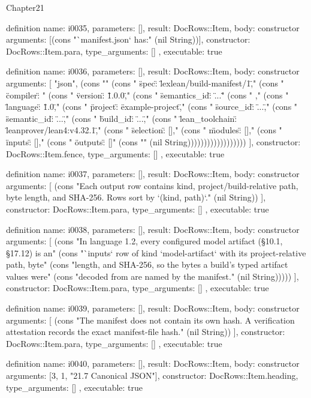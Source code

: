 \begin{lexlean}{Chapter21}
\begin{semanticmodule}
definition{
  name: i0035,
  parameters: [],
  result: DocRows::Item,
  body: constructor{
    arguments: [(cons "`manifest.json` has:" (nil String))],
    constructor: DocRows::Item.para,
    type_arguments: []
  },
  executable: true
}

definition{
  name: i0036,
  parameters: [],
  result: DocRows::Item,
  body: constructor{
    arguments: [
      "json",
      (cons "{" (cons "  \"spec\": \"lexlean/build-manifest/1\"," (cons "  \"compiler\": {" (cons "    \"version\": \"1.0.0\"," (cons "    \"semantics_id\": \"...\"" (cons "  }," (cons "  \"language\": \"1.0\"," (cons "  \"project\": \"example-project\"," (cons "  \"source_id\": \"...\"," (cons "  \"semantic_id\": \"...\"," (cons "  \"build_id\": \"...\"," (cons "  \"lean_toolchain\": \"leanprover/lean4:v4.32.1\"," (cons "  \"selection\": []," (cons "  \"modules\": []," (cons "  \"inputs\": []," (cons "  \"outputs\": []" (cons "}" (nil String))))))))))))))))))
    ],
    constructor: DocRows::Item.fence,
    type_arguments: []
  },
  executable: true
}

definition{
  name: i0037,
  parameters: [],
  result: DocRows::Item,
  body: constructor{
    arguments: [
      (cons "Each output row contains kind, project/build-relative path, byte length, and SHA-256. Rows sort by `(kind, path)`." (nil String))
    ],
    constructor: DocRows::Item.para,
    type_arguments: []
  },
  executable: true
}

definition{
  name: i0038,
  parameters: [],
  result: DocRows::Item,
  body: constructor{
    arguments: [
      (cons "In language 1.2, every configured model artifact (§10.1, §17.12) is an" (cons "`inputs` row of kind `model-artifact` with its project-relative path, byte" (cons "length, and SHA-256, so the bytes a build's typed artifact values were" (cons "decoded from are named by the manifest." (nil String)))))
    ],
    constructor: DocRows::Item.para,
    type_arguments: []
  },
  executable: true
}

definition{
  name: i0039,
  parameters: [],
  result: DocRows::Item,
  body: constructor{
    arguments: [
      (cons "The manifest does not contain its own hash. A verification attestation records the exact manifest-file hash." (nil String))
    ],
    constructor: DocRows::Item.para,
    type_arguments: []
  },
  executable: true
}

definition{
  name: i0040,
  parameters: [],
  result: DocRows::Item,
  body: constructor{
    arguments: [3, 1, "21.7 Canonical JSON"],
    constructor: DocRows::Item.heading,
    type_arguments: []
  },
  executable: true
}


\end{semanticmodule}
\end{lexlean}
